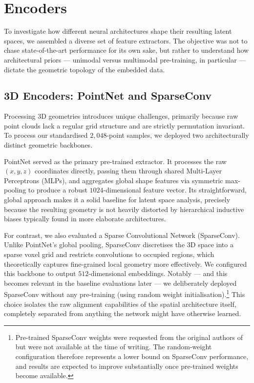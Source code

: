\section{Encoders}
\label{sec:encoders_setup}

To investigate how different neural architectures shape their resulting latent spaces, we assembled a diverse set of feature extractors. The objective was not to chase state-of-the-art performance for its own sake, but rather to understand how architectural priors --- unimodal versus multimodal pre-training, in particular --- dictate the geometric topology of the embedded data.

\subsection{3D Encoders: PointNet and SparseConv}
\label{subsec:3d_encoders}

Processing 3D geometries introduces unique challenges, primarily because raw point clouds lack a regular grid structure and are strictly permutation invariant. To process our standardised $2{,}048$-point samples, we deployed two architecturally distinct geometric backbones.

PointNet served as the primary pre-trained extractor. It processes the raw $(x, y, z)$ coordinates directly, passing them through shared Multi-Layer Perceptrons (MLPs), and aggregates global shape features via symmetric max-pooling to produce a robust $1024$-dimensional feature vector. Its straightforward, global approach makes it a solid baseline for latent space analysis, precisely because the resulting geometry is not heavily distorted by hierarchical inductive biases typically found in more elaborate architectures.

For contrast, we also evaluated a Sparse Convolutional Network (SparseConv). Unlike PointNet's global pooling, SparseConv discretises the 3D space into a sparse voxel grid and restricts convolutions to occupied regions, which theoretically captures fine-grained local geometry more effectively. We configured this backbone to output $512$-dimensional embeddings. Notably --- and this becomes relevant in the baseline evaluations later --- we deliberately deployed SparseConv without any pre-training (using random weight initialisation).\footnote{Pre-trained SparseConv weights were requested from the original authors of \textcite{hadgi2025escaping} but were not available at the time of writing. The random-weight configuration therefore represents a lower bound on SparseConv performance, and results are expected to improve substantially once pre-trained weights become available.} This choice isolates the raw alignment capabilities of the spatial architecture itself, completely separated from anything the network might have otherwise learned.

